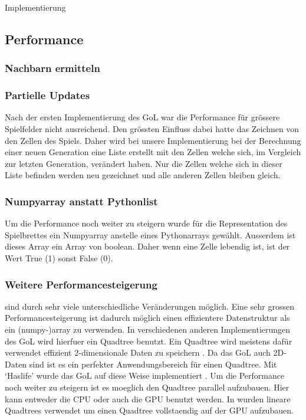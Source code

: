 \documentclass[runningheads]{llncs}
\begin{document}
\begin{section}{Implementierung}
    \subsection{Performance}

    \subsubsection{Nachbarn ermitteln}

    \subsubsection{Partielle Updates}
        Nach der ersten Implementierung des GoL war die Performance für grössere Spielfelder nicht ausreichend.
        Den grössten Einfluss dabei hatte das Zeichnen von den Zellen des Spiels.
        Daher wird bei unsere Implementierung bei der Berechnung einer neuen Generation eine Liste erstellt mit den Zellen welche sich,
        im Vergleich zur letzten Generation, verändert haben.
        Nur die Zellen welche sich in dieser Liste befinden werden neu gezeichnet und alle anderen Zellen bleiben gleich.

    \subsubsection{Numpyarray anstatt Pythonlist}
        Um die Performance noch weiter zu steigern wurde für die Representation des Spielbrettes ein Numpyarray anstelle eines Pythonarrays gewählt.
        Ausserdem ist dieses Array ein Array von boolean. 
        Daher wenn eine Zelle lebendig ist, ist der Wert True (1) sonst False (0).

    
    \subsubsection{Weitere Performancesteigerung}
        sind durch sehr viele unterschiedliche Veränderungen möglich.
        Eine sehr grossen Performancesteigerung ist dadurch möglich einen effizientere Datenstruktur als ein (numpy-)array zu verwenden.
        In verschiedenen anderen Implementierungen des GoL wird hierfuer ein Quadtree benutzt.
        Ein Quadtree wird meistens dafür verwendet effizient 2-dimensionale Daten zu speichern \cite{quadtreeGeeksForGeeks}.
        Da das GoL auch 2D-Daten sind ist es ein perfekter Anwendungsbereich für einen Quadtree.
        Mit `Haslife' wurde das GoL auf diese Weise implementiert \cite{haslifeWiki}. \newline
        Um die Performance noch weiter zu steigern ist es moeglich den Quadtree parallel aufzubauen.
        Hier kann entweder die CPU oder auch die GPU benutzt werden.
        In \cite{quadtreesOnGPU} wurden lineare Quadtrees verwendet um einen Quadtree vollstaendig auf der GPU aufzubauen.
       

\end{section}
\end{document}

